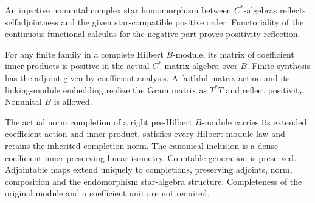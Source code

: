 \begin{proposition}\label{prop:injective-star-hom-positivity}
\leanok
An injective nonunital complex star homomorphism between $C^*$-algebras
reflects selfadjointness and the given star-compatible positive order.
Functoriality of the continuous functional calculus for the negative part
proves positivity reflection.
\end{proposition}

\begin{proposition}\label{prop:hilbert-module-gram-positivity}
\leanok
For any finite family in a complete Hilbert $B$-module, its matrix of
coefficient inner products is positive in the actual $C^*$-matrix algebra
over $B$. Finite synthesis has the adjoint given by coefficient analysis.
A faithful matrix action and its linking-module embedding realize the Gram
matrix as $T^*T$ and reflect positivity. Nonunital $B$ is allowed.
\end{proposition}

\begin{proposition}\label{prop:hilbert-module-completion}
\leanok
The actual norm completion of a right pre-Hilbert $B$-module carries its
extended coefficient action and inner product, satisfies every Hilbert-module
law and retains the inherited completion norm. The canonical inclusion is a
dense coefficient-inner-preserving linear isometry. Countable generation is
preserved. Adjointable maps extend uniquely to completions, preserving
adjoints, norm, composition and the endomorphism star-algebra structure.
Completeness of the original module and a coefficient unit are not required.
\end{proposition}

